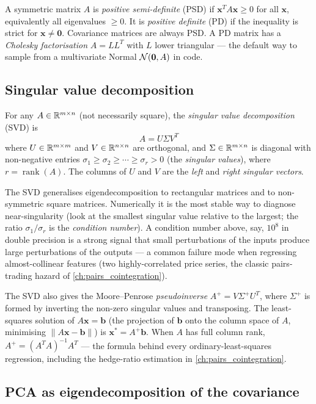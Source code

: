 A symmetric matrix $A$ is \emph{positive semi-definite} (PSD) if
$\bm{x}^T A \bm{x} \ge 0$ for all $\bm{x}$, equivalently all
eigenvalues $\ge 0$. It is \emph{positive definite} (PD) if the
inequality is strict for $\bm{x} \ne \bm{0}$. Covariance matrices are
always PSD. A PD matrix has a \emph{Cholesky factorisation}
$A = LL^T$ with $L$ lower triangular --- the default way to sample
from a multivariate Normal $\mathcal{N}(\bm{0}, A)$ in code.

\subsection{Singular value decomposition}

For any $A \in \mathbb{R}^{m\times n}$ (not necessarily square), the
\emph{singular value decomposition} (SVD) is
\[
A = U \Sigma V^T
\]
where $U \in \mathbb{R}^{m\times m}$ and $V \in \mathbb{R}^{n\times n}$ are orthogonal,
and $\Sigma \in \mathbb{R}^{m\times n}$ is diagonal with non-negative entries
$\sigma_1 \ge \sigma_2 \ge \cdots \ge \sigma_r > 0$ (the \emph{singular
values}), where $r = \operatorname{rank}(A)$. The columns of $U$ and $V$
are the \emph{left} and \emph{right singular vectors}.

The SVD generalises eigendecomposition to rectangular matrices and to
non-symmetric square matrices. Numerically it is the most stable way to
diagnose near-singularity (look at the smallest singular value relative
to the largest; the ratio $\sigma_1/\sigma_r$ is the \emph{condition
number}). A condition number above, say, $10^8$ in double precision is
a strong signal that small perturbations of the inputs produce large
perturbations of the outputs --- a common failure mode when regressing
almost-collinear features (two highly-correlated price series, the
classic pairs-trading hazard of \cref{ch:pairs_cointegration}).

The SVD also gives the Moore--Penrose \emph{pseudoinverse}
$A^+ = V \Sigma^+ U^T$, where $\Sigma^+$ is formed by inverting the
non-zero singular values and transposing. The least-squares solution
of $A\bm{x} = \bm{b}$ (the projection of $\bm{b}$ onto the column space
of $A$, minimising $\|A\bm{x} - \bm{b}\|$) is $\bm{x}^* = A^+ \bm{b}$.
When $A$ has full column rank, $A^+ = (A^T A)^{-1}A^T$ --- the formula
behind every ordinary-least-squares regression, including the hedge-ratio
estimation in \cref{ch:pairs_cointegration}.

\subsection{PCA as eigendecomposition of the covariance}

